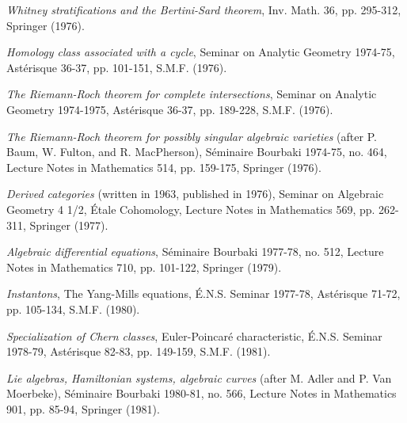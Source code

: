 \begin{description}
\item[{[24]}] \emph{Whitney stratifications and the Bertini-Sard theorem},
Inv. Math. 36, pp. 295-312, Springer (1976).

\item[{[25]}] \emph{Homology class associated with a cycle}, Seminar on
Analytic Geometry 1974-75, Astérisque 36-37, pp. 101-151, S.M.F. (1976).

\item[{[26]}] \emph{The Riemann-Roch theorem for complete intersections},
Seminar on Analytic Geometry 1974-1975, Astérisque 36-37, pp. 189-228,
S.M.F. (1976).

\item[{[27]}] \emph{The Riemann-Roch theorem for possibly singular algebraic
varieties} (after P. Baum, W. Fulton, and R. MacPherson), Séminaire Bourbaki
1974-75, no. 464, Lecture Notes in Mathematics 514, pp. 159-175,
Springer (1976).

\item[{[28]}] \emph{Derived categories} (written in 1963, published in 1976),
Seminar on Algebraic Geometry 4 1/2, Étale Cohomology,
Lecture Notes in Mathematics 569, pp. 262-311, Springer (1977).

\item[{[29]}] \emph{Algebraic differential equations}, Séminaire Bourbaki
1977-78, no. 512, Lecture Notes in Mathematics 710, pp. 101-122,
Springer (1979).

\item[{[30]}] \emph{Instantons}, The Yang-Mills equations, É.N.S. Seminar
1977-78, Astérisque 71-72, pp. 105-134, S.M.F. (1980).

\item[{[31]}] \emph{Specialization of Chern classes}, Euler-Poincaré
characteristic, É.N.S. Seminar 1978-79, Astérisque 82-83, pp. 149-159,
S.M.F. (1981).

\item[{[32]}] \emph{Lie algebras, Hamiltonian systems, algebraic curves}
(after M. Adler and P. Van Moerbeke), Séminaire Bourbaki 1980-81, no. 566,
Lecture Notes in Mathematics 901, pp. 85-94, Springer (1981).


\end{description}
